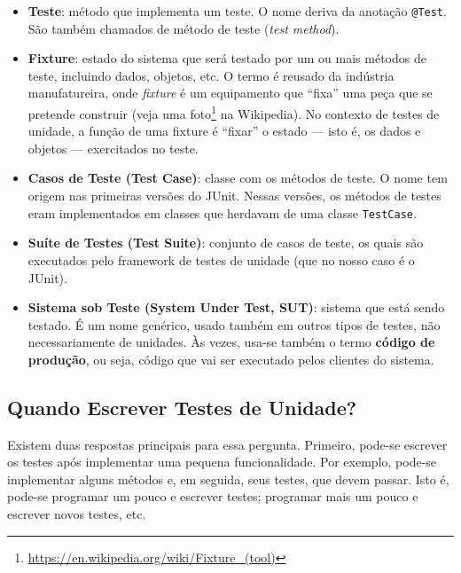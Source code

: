 \documentclass[
  11pt,
  twoside]{book}
\newcommand{\passthrough}[1]{#1}
\DeclareRobustCommand{\href}[2]{#2\footnote{\url{#1}}}
\begin{document}
\begin{itemize}
\item
  \textbf{Teste}: método que implementa um teste. O nome deriva da
  anotação \passthrough{\lstinline!@Test!}. São também chamados de
  método de teste (\emph{test method}).
\item
  \textbf{Fixture}: estado do sistema que será testado por um ou mais
  métodos de teste, incluindo dados, objetos, etc. O termo é reusado da
  indústria manufatureira, onde \emph{fixture}
   é um equipamento que ``fixa'' uma
  peça que se pretende construir (veja uma
  \href{https://en.wikipedia.org/wiki/Fixture_(tool)}{foto} na
  Wikipedia). No contexto de testes de unidade, a função de uma fixture
  é ``fixar'' o estado --- isto é, os dados e objetos --- exercitados no
  teste.
\item
  \textbf{Casos de Teste (Test Case)}:
   classe com os métodos de
  teste. O nome tem origem nas primeiras versões do JUnit. Nessas
  versões, os métodos de testes eram implementados em classes que
  herdavam de uma classe \passthrough{\lstinline!TestCase!}.
\item
  \textbf{Suíte de Testes (Test Suite)}:
   conjunto de casos de teste,
  os quais são executados pelo framework de testes de unidade (que no
  nosso caso é o JUnit).
\item
  \textbf{Sistema sob Teste (System Under Test, SUT)}:
   sistema que está sendo testado. É um
  nome genérico, usado também em outros tipos de testes, não
  necessariamente de unidades. Às vezes, usa-se também o termo
  \textbf{código de produção}, ou seja, código que vai ser executado
  pelos clientes do sistema.
\end{itemize}

\hypertarget{quando-escrever-testes-de-unidade}{%
\subsection{Quando Escrever Testes de
Unidade?}\label{quando-escrever-testes-de-unidade}}


Existem duas respostas principais para essa pergunta. Primeiro, pode-se
escrever os testes após implementar uma pequena funcionalidade. Por
exemplo, pode-se implementar alguns métodos e, em seguida, seus testes,
que devem passar. Isto é, pode-se programar um pouco e escrever testes;
programar mais um pouco e escrever novos testes, etc.
\end{document}
